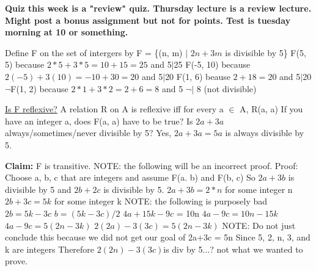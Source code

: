 \documentclass{article}
\begin{document}
\textbf{Quiz this week is a "review" quiz. Thursday lecture is a review lecture. Might post a bonus assignment but not for points. Test is tuesday morning at 10 or something.}\newline\newline

Define F on the set of intergers by F = \{(n, m) $\mid$ $2n+3m$ is divisible by 5\}\newline
F(5, 5) because $2*5 + 3*5 = 10+15=25$ and 5$\mid$25\newline
F(-5, 10) because $2(-5)+3(10)=-10+30=20$ and 5$\mid$20\newline
F(1, 6) beause $2+18=20$ and 5$\mid$20\newline
$\neg$F(1, 2) because $2*1+3*2=2+6=8$ and 5 $\neg$$\mid$ 8 (not divisible)\newline\newline

\underline{Is F reflexive?}\newline
A relation R on A is reflexive iff for every a $\in$ A, R(a, a)\newline
If you have an integer a, does F(a, a) have to be true?\newline
Is $2a + 3a$ always/sometimes/never divisible by 5?\newline
Yes, $2a+3a=5a$ is always divisible by 5.\newline\newline\newline


\textbf{Claim:}\newline
F is transitive.\newline
NOTE: the following will be an incorrect proof.\newline
Proof:\newline
Choose a, b, c that are integers and assume F(a. b) and F(b, c)\newline
So $2a+3b$ is divisible by 5 and $2b+2c$ is divisible by 5.\newline
$2a+3b=2*n$ for some integer n\newline
$2b+3c=5k$ for some integer k\newline
NOTE: the following is purposely bad\newline
$2b = 5k-3c$\newline
$b = (5k-3c)/2$\newline
$4a+15k-9c$ = 10n\newline
$4a-9c=10n-15k$\newline
$4a-9c=5(2n-3k)$\newline
$2(2a)-3(3c)=5(2n-3k)$\newline
NOTE: Do not just conclude this because we did not get our goal of 2a+3c = 5n\newline
Since 5, 2, n, 3, and k are integers\newline
Therefore $2(2n)-3(3c)$is div by 5...? not what we wanted to prove.\newline











\enddocument
\end{document}
